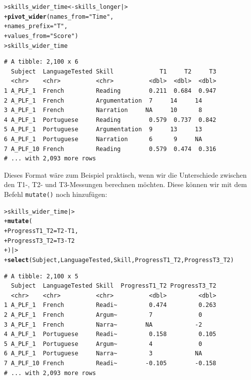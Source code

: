 \documentclass[oneside, 10pt]{book}\usepackage[]{graphicx}\usepackage[]{xcolor}
\makeatletter
\newcommand{\hlstr}[1]{\textcolor[rgb]{0.192,0.494,0.8}{#1}}%
\newcommand{\hlopt}[1]{\textcolor[rgb]{0,0,0}{#1}}%
\newcommand{\hlstd}[1]{\textcolor[rgb]{0.345,0.345,0.345}{#1}}%
\newcommand{\hlkwb}[1]{\textcolor[rgb]{0.69,0.353,0.396}{#1}}%
\newcommand{\hlkwc}[1]{\textcolor[rgb]{0.333,0.667,0.333}{#1}}%
\newcommand{\hlkwd}[1]{\textcolor[rgb]{0.737,0.353,0.396}{\textbf{#1}}}%
\newenvironment{kframe}{%
 \def\at@end@of@kframe{}%
 \ifinner\ifhmode%
  \def\at@end@of@kframe{\end{minipage}}%
  \begin{minipage}{\columnwidth}%
 \fi\fi%
 \def\FrameCommand##1{\hskip\@totalleftmargin \hskip-\fboxsep
 \colorbox{shadecolor}{##1}\hskip-\fboxsep
     \hskip-\linewidth \hskip-\@totalleftmargin \hskip\columnwidth}%
 \MakeFramed {\advance\hsize-\width
   \@totalleftmargin\z@ \linewidth\hsize
   \@setminipage}}%
 {\par\unskip\endMakeFramed%
 \at@end@of@kframe}
\newenvironment{knitrout}{}{} %
\makeatother
\begin{document}
\begin{knitrout}
\color{fgcolor}\begin{kframe}
\begin{alltt}
\hlstd{> }\hlstd{skills_wider_time} \hlkwb{<-} \hlstd{skills_longer |>}
\hlstd{+ }  \hlkwd{pivot_wider}\hlstd{(}\hlkwc{names_from} \hlstd{=} \hlstr{"Time"}\hlstd{,}
\hlstd{+ }              \hlkwc{names_prefix} \hlstd{=} \hlstr{"T"}\hlstd{,}
\hlstd{+ }              \hlkwc{values_from} \hlstd{=} \hlstr{"Score"}\hlstd{)}
\hlstd{> }\hlstd{skills_wider_time}
\end{alltt}
\begin{verbatim}
# A tibble: 2,100 x 6
  Subject  LanguageTested Skill             T1     T2     T3
  <chr>    <chr>          <chr>          <dbl>  <dbl>  <dbl>
1 A_PLF_1  French         Reading        0.211  0.684  0.947
2 A_PLF_1  French         Argumentation  7     14     14    
3 A_PLF_1  French         Narration     NA     10      8    
4 A_PLF_1  Portuguese     Reading        0.579  0.737  0.842
5 A_PLF_1  Portuguese     Argumentation  9     13     13    
6 A_PLF_1  Portuguese     Narration      6      9     NA    
7 A_PLF_10 French         Reading        0.579  0.474  0.316
# ... with 2,093 more rows
\end{verbatim}
\end{kframe}
\end{knitrout}

Dieses Format wäre zum Beispiel praktisch, wenn wir die Unterschiede zwischen
den T1-, T2- und T3-Messungen berechnen möchten. Diese können wir mit
dem Befehl \texttt{mutate()} noch hinzufügen:
\begin{knitrout}
\color{fgcolor}\begin{kframe}
\begin{alltt}
\hlstd{> }\hlstd{skills_wider_time |>}
\hlstd{+ }  \hlkwd{mutate}\hlstd{(}
\hlstd{+ }    \hlkwc{ProgressT1_T2} \hlstd{= T2} \hlopt{-} \hlstd{T1,}
\hlstd{+ }    \hlkwc{ProgressT3_T2} \hlstd{= T3} \hlopt{-} \hlstd{T2}
\hlstd{+ }  \hlstd{) |>}
\hlstd{+ }  \hlkwd{select}\hlstd{(Subject, LanguageTested, Skill, ProgressT1_T2, ProgressT3_T2)}
\end{alltt}
\begin{verbatim}
# A tibble: 2,100 x 5
  Subject  LanguageTested Skill  ProgressT1_T2 ProgressT3_T2
  <chr>    <chr>          <chr>          <dbl>         <dbl>
1 A_PLF_1  French         Readi~         0.474         0.263
2 A_PLF_1  French         Argum~         7             0    
3 A_PLF_1  French         Narra~        NA            -2    
4 A_PLF_1  Portuguese     Readi~         0.158         0.105
5 A_PLF_1  Portuguese     Argum~         4             0    
6 A_PLF_1  Portuguese     Narra~         3            NA    
7 A_PLF_10 French         Readi~        -0.105        -0.158
# ... with 2,093 more rows
\end{verbatim}
\end{kframe}
\end{knitrout}
\end{document}
